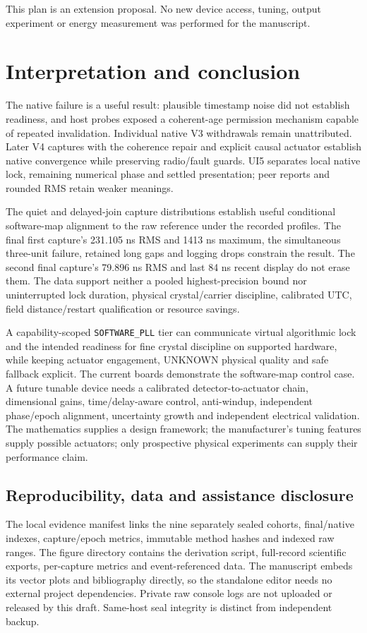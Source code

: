 \documentclass[11pt,letterpaper]{article}
\newcommand{\code}[1]{\texttt{\small #1}}
\begin{document}
This plan is an extension proposal. No new device access, tuning, output experiment or energy measurement was performed for the manuscript.

\section{Interpretation and conclusion}
The native failure is a useful result: plausible timestamp noise did not establish readiness, and host probes exposed a coherent-age permission mechanism capable of repeated invalidation. Individual native V3 withdrawals remain unattributed. Later V4 captures with the coherence repair and explicit causal actuator establish native convergence while preserving radio/fault guards. UI5 separates local native lock, remaining numerical phase and settled presentation; peer reports and rounded RMS retain weaker meanings.

The quiet and delayed-join capture distributions establish useful conditional software-map alignment to the raw reference under the recorded profiles. The final first capture's 231.105 ns RMS and 1413 ns maximum, the simultaneous three-unit failure, retained long gaps and logging drops constrain the result. The second final capture's 79.896 ns RMS and last 84 ns recent display do not erase them. The data support neither a pooled highest-precision bound nor uninterrupted lock duration, physical crystal/carrier discipline, calibrated UTC, field distance/restart qualification or resource savings.

A capability-scoped \code{SOFTWARE\_PLL} tier can communicate virtual algorithmic lock and the intended readiness for fine crystal discipline on supported hardware, while keeping actuator engagement, UNKNOWN physical quality and safe fallback explicit. The current boards demonstrate the software-map control case. A future tunable device needs a calibrated detector-to-actuator chain, dimensional gains, time/delay-aware control, anti-windup, independent phase/epoch alignment, uncertainty growth and independent electrical validation. The mathematics supplies a design framework; the manufacturer's tuning features supply possible actuators; only prospective physical experiments can supply their performance claim.

\subsection*{Reproducibility, data and assistance disclosure}
The local evidence manifest links the nine separately sealed cohorts, final/native indexes, capture/epoch metrics, immutable method hashes and indexed raw ranges. The figure directory contains the derivation script, full-record scientific exports, per-capture metrics and event-referenced data. The manuscript embeds its vector plots and bibliography directly, so the standalone editor needs no external project dependencies. Private raw console logs are not uploaded or released by this draft. Same-host seal integrity is distinct from independent backup.
\end{document}
